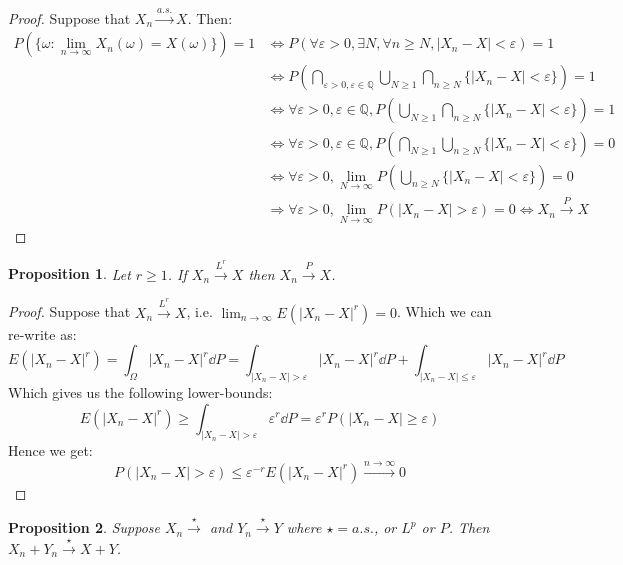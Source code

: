 \documentclass[10pt,a4paper]{book}
\newtheorem{proposition}{Proposition}[section]
\theoremstyle{definition}
\begin{document}
\begin{proof}
Suppose that $X_n \stackrel{a.s.}{\longrightarrow} X$. Then:
\begin{align*}
P(\{\omega : \lim_{n \to \infty} X_n(\omega) = X(\omega)\}) = 1 &\Leftrightarrow P(\forall \varepsilon > 0, \exists N, \forall n \geq N, |X_n - X| < \varepsilon) = 1\\
&\Leftrightarrow P\left(\bigcap_{\varepsilon > 0, \varepsilon \in \mathbb{Q}} \bigcup_{N \geq 1} \bigcap_{n \geq N} \{|X_n - X| < \varepsilon\} \right) = 1\\
&\Leftrightarrow \forall \varepsilon > 0, \varepsilon \in \mathbb{Q}, P(\bigcup_{N \geq 1} \bigcap_{n \geq N} \{|X_n - X| < \varepsilon\}) = 1\\
&\Leftrightarrow \forall \varepsilon > 0, \varepsilon \in \mathbb{Q}, P(\bigcap_{N \geq 1} \bigcup_{n \geq N} \{|X_n - X| < \varepsilon\}) = 0\\
&\Leftrightarrow \forall \varepsilon > 0, \lim_{N \to \infty} P(\bigcup_{n \geq N} \{|X_n - X| < \varepsilon\}) = 0 \\
&\Rightarrow \forall \varepsilon > 0, \lim_{N \to \infty} P(|X_n - X| > \varepsilon) = 0 \Leftrightarrow X_n \stackrel{P}{\longrightarrow} X 
\end{align*}
\end{proof}

\begin{proposition}
Let $r \geq 1$. If $X_n \stackrel{L^r}{\longrightarrow} X$ then $X_n \stackrel{P}{\longrightarrow} X$. 
\end{proposition}

\begin{proof}
Suppose that $X_n \stackrel{L^r}{\longrightarrow} X$, i.e. $\lim_{n \to \infty} E(|X_n - X|^r) = 0$. Which we can re-write as:
\[
E(|X_n - X|^r) = \int_\Omega |X_n - X|^r \dd P = \int_{|X_n - X| > \varepsilon} |X_n - X|^r \dd P + \int_{|X_n - X| \leq \varepsilon} |X_n - X|^r \dd P 
\]
Which gives us the following lower-bounds:
\[
E(|X_n - X|^r) \geq \int_{|X_n - X| > \varepsilon} \varepsilon^r \dd P = \varepsilon^r P(|X_n - X| \geq \varepsilon)
\]
Hence we get:
\[
P(|X_n - X| > \varepsilon) \leq \varepsilon^{-r} E(|X_n - X|^r) \stackrel{n \to \infty}{\longrightarrow} 0 
\]
\end{proof}

\begin{proposition}

Suppose $X_n \stackrel{\star}{\longrightarrow}$ and $Y_n \stackrel{\star}{\longrightarrow} Y$ where $\star = a.s.$, or $L^p$ or $P$. Then $X_n + Y_n \stackrel{\star}{\longrightarrow} X+ Y$. 

\end{proposition}
\end{document}

